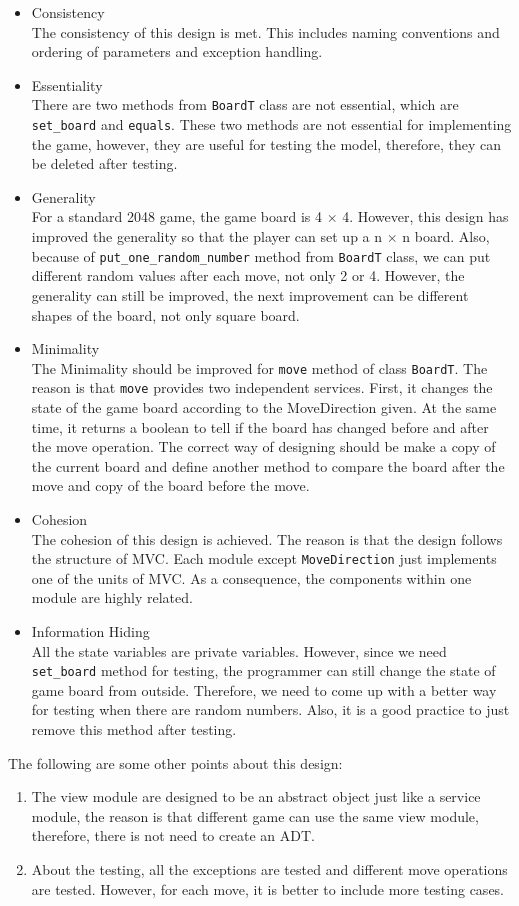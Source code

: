 \documentclass[12pt]{article}
\begin{document}
\begin{itemize}
\item Consistency\\
The consistency of this design is met. This includes naming
conventions and ordering of parameters and exception handling. 
\item Essentiality\\
There are two methods from \verb|BoardT| class are not essential, 
which are \verb|set_board| and \verb|equals|. These two methods are
not essential for implementing the game, however, they are  useful for testing
the model, therefore, they can be deleted after testing.
\item Generality\\
For a standard 2048 game, the game board is 4 $\times$ 4. However, 
this design has improved the generality so that the player can set
up a n $\times$ n board. Also, because of \verb|put_one_random_number| method from \verb|BoardT| class, we can put different random values after each move, not only 2 or 4. However,
the generality can still be improved, the next improvement can be
different shapes of the board, not only square board.
\item Minimality\\
The Minimality should be improved for \verb|move| method of class \verb|BoardT|. The reason is that \verb|move| provides two 
independent services. First, it changes the state of the game board 
according to the MoveDirection given. At the same time, it returns
a boolean to tell if the board has changed before and after the move
operation. The correct way of designing should be make a copy of 
the current board and define another method to compare the board after
the move and copy of the board before the move.
\item Cohesion\\
The cohesion of this design is achieved. The reason is that the design
follows the structure of MVC. Each module except \verb|MoveDirection| just implements one of the units of MVC. As a consequence, the components within one module are highly related.
\item Information Hiding\\
All the state variables are private variables. However, since we need
\verb|set_board| method for testing, the programmer can still change
the state of game board from outside. Therefore, we need to come up with a better way for testing when there are random numbers. Also,
it is a good practice to just remove this method after testing.
\end{itemize}
\newpage
The following are some other points about this design:
\begin{enumerate}
\item  The view module are designed to be an abstract object just 
like a service module, the reason is that different game can use the 
same view module, therefore, there is not need to create an ADT.
\item About the testing, all the exceptions are tested and different
move operations are tested. However, for each move, it is better to
include more testing cases.
\end{enumerate}
\end{document}
